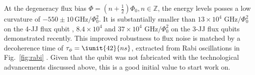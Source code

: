  At the  degeneracy flux bias $  \Phi = (n +  \frac{1}{2})\Phi_0, n\in\mathbb{Z} $, the  energy levels
 posses a low  curvature of $ -550\pm10\,\text{GHz}/\Phi_0^2 $. It  is substantially smaller than
 $   13\times   10^4$   $   \text{GHz}/\Phi_0^2$    on   the   4-JJ   flux   qubit   \cite{stern2014},
 $ 8.4 \times  10^4$ \cite{zhu2010} and $ 37\times 10^{4}$  $ \text{GHz}/\Phi_0^2$ \cite{gustavsson2012} on
 the  3-JJ flux  qubits demonstrated  recently.   This improved  robustness to  flux noise  is
 matched by a decoherence  time of $ \tau_\phi = \iunit{42}{ns} $,  extracted from Rabi oscillations
 in  Fig.~\ref{fig:rabi} \cite{rabi}.   Given  that  the qubit  was  not  fabricated with  the
 technological advancements discussed above, this is a good initial value to start work on.

